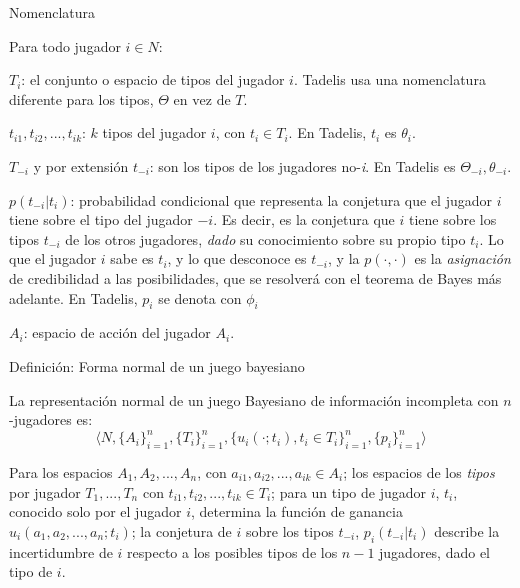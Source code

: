 \documentclass[12pt]{article}
\begin{document}
\begin{summarybox}[colback=red!15]{Nomenclatura}

	Para todo jugador $i \in N$:

	\begin{myitemize}
		\item $T_i$: el conjunto o espacio de tipos del jugador $i$. Tadelis usa una nomenclatura diferente para los tipos, $\Theta \text{ en vez de } T$.
		\item $t_{i1}, t_{i2}, ..., t_{ik}$: $k$ tipos del jugador $i$, con $t_{i} \in T_i$. En Tadelis, $t_{i}$ es $\theta_{i}$.
		\item $T_{-i}$ y por extensión $t_{-i}$: son los tipos de los jugadores no-\textit{i}. En Tadelis es $\Theta_{-i}, \theta_{-i}$.
		\item $p(t_{-i}|t_i)$: probabilidad condicional que representa la conjetura que el jugador $i$ tiene sobre el tipo del jugador $-i$. Es decir, es la conjetura que $i$ tiene sobre los tipos $t_{-i}$ de los otros jugadores, \textit{dado} su conocimiento sobre su propio tipo $t_i$. Lo que el jugador $i$ sabe es $t_i$, y lo que desconoce es $t_{-i}$, y la $p(\cdot, \cdot)$ es la \textit{asignación} de credibilidad a las posibilidades, que se resolverá con el teorema de Bayes más adelante. En Tadelis, $p_i$ se denota con $\phi_i$
		\item $A_i$: espacio de acción del jugador $A_i$.
	\end{myitemize}
\end{summarybox}

\begin{mybox}{Definición: Forma normal de un juego bayesiano}
	\begin{defi}
		La representación normal de un juego Bayesiano de información incompleta con $n$-jugadores es:
		\[ \langle N, \{A_i \}_{i=1}^n, \{ T_i \}_{i=1}^n, \{u_i(\cdot; t_i ), t_i \in T_i\}_{i=1}^n, \{ p_i \}_{i=1}^n \rangle \]

		Para los espacios $A_1, A_2, ..., A_n$, con $a_{i1}, a_{i2}, ..., a_{ik} \in A_i$; los espacios de los \textit{tipos} por jugador $T_1, ..., T_n$ con $t_{i1}, t_{i2}, ..., t_{ik} \in T_i$; para un tipo de jugador $i$, $t_i$, conocido solo por el jugador $i$, determina la función de ganancia $u_{i}(a_1, a_2, ..., a_n; t_i)$; la conjetura de $i$ sobre los tipos $t_{-i}$, $p_i(t_{-i}|t_i)$ describe la incertidumbre de $i$ respecto a los posibles tipos de los $n-1$ jugadores, dado el tipo de $i$.

	\end{defi}
\end{mybox}
\end{document}
